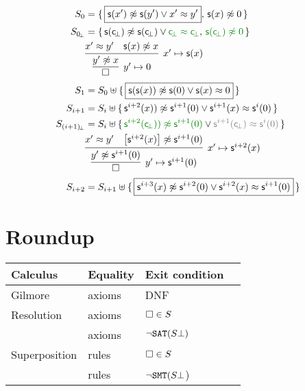 \begin{align*}
S_0 &= \{\, \boxed{\msucc(x') \mNE \msucc (y') \lor x' \mEQ y'}, \, \msucc(x)\mNE 0 \, \} 
\\
S_{0\!_\bot} &= \{\, \msucc(\consbot) \mNE \msucc (\consbot) \lor{\colHi\consbot \mEQ \consbot}, \, {\colHi \msucc(\consbot)\mNE 0} \, \}
\\
&\infer[x'\mapsto \msucc(x)
]{ 
	\infer[y'\mapsto 0]{\emptyclause}{ y'\mNE x }
}
{x' \mEQ y' & \msucc(x)\mNE x}
\\
S_1 &= S_0\disjointunion \{\,
\boxed{\msucc(\msucc(x)) \mNE \msucc(0) \lor \msucc(x) \mEQ 0} \,
\} 
\\
S_{i+1} &= S_i\disjointunion \{\,
\msucc^{i+2}(x)) \mNE \msucc^{i+1} (0) \lor \msucc^{i+1}(x) \mEQ \msucc^i(0) \,
\} 
\\
S_{(i+1)\!_\bot} &= S_i\disjointunion \{\,
{\colHi \msucc^{i+2}(\consbot)) \mNE \msucc^{i+1} (0)} \lor {\colG\msucc^{i+1}(\consbot) \mEQ \msucc^i(0)} \,
\} 
\\
&\infer[x'\mapsto \msucc^{i+2}(x)
]{ 
	\infer[y'\mapsto \msucc^{i+1}(0)]{\emptyclause}{ y'\mNE \msucc^{i+1}(0) }
}
{x' \mEQ y' & \left[\msucc^{i+2}(x)\right]\mNE \msucc^{i+1}(0)}
\\
S_{i+2} &= S_{i+1}\disjointunion \{\,
\boxed{\msucc^{i+3}(x) \mNE \msucc^{i+2}(0) \lor \msucc^{i+2}(x) \mEQ \msucc^{i+1}(0)} \,
\} 
\end{align*}

\section{Roundup}

\begin{tabular}{llll}
	Calculus & Equality & Exit condition \\
	\hline
	Gilmore & axioms & DNF \\
	Resolution & axioms & $\square\in S$\\
	\InstGen & axioms & $\lnot\texttt{SAT}(S\bot)$ \\
	Superposition & rules & $\square\in S$ \\
	\InstGenEQ & rules & $\lnot\texttt{SMT}(S\bot$)
\end{tabular}




